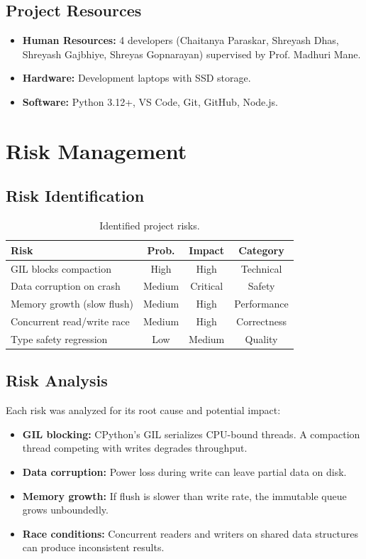 \documentclass[oneside,a4paper,12pt]{book}
\begin{document}
\subsection{Project Resources}
\begin{itemize}[leftmargin=2em]
    \item \textbf{Human Resources:} 4 developers (Chaitanya Paraskar, Shreyash Dhas, Shreyash Gajbhiye, Shreyas Gopnarayan) supervised by Prof. Madhuri Mane.
    \item \textbf{Hardware:} Development laptops with SSD storage.
    \item \textbf{Software:} Python 3.12+, VS Code, Git, GitHub, Node.js.
\end{itemize}

\section{Risk Management}

\subsection{Risk Identification}

\begin{table}[H]
\centering
\renewcommand{\arraystretch}{1.3}
\begin{tabularx}{\textwidth}{|X|c|c|c|}
\hline
\textbf{Risk} & \textbf{Prob.} & \textbf{Impact} & \textbf{Category} \\
\hline
GIL blocks compaction & High & High & Technical \\
\hline
Data corruption on crash & Medium & Critical & Safety \\
\hline
Memory growth (slow flush) & Medium & High & Performance \\
\hline
Concurrent read/write race & Medium & High & Correctness \\
\hline
Type safety regression & Low & Medium & Quality \\
\hline
\end{tabularx}
\caption{Identified project risks.}
\end{table}

\subsection{Risk Analysis}

Each risk was analyzed for its root cause and potential impact:
\begin{itemize}[leftmargin=2em]
    \item \textbf{GIL blocking:} CPython's GIL serializes CPU-bound threads. A compaction thread competing with writes degrades throughput.
    \item \textbf{Data corruption:} Power loss during write can leave partial data on disk.
    \item \textbf{Memory growth:} If flush is slower than write rate, the immutable queue grows unboundedly.
    \item \textbf{Race conditions:} Concurrent readers and writers on shared data structures can produce inconsistent results.
\end{itemize}
\end{document}
